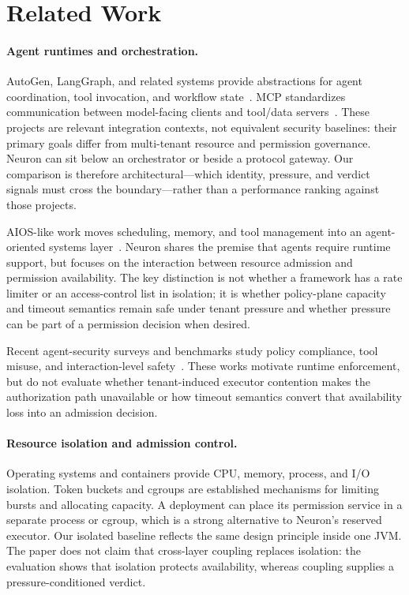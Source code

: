 \section{Related Work}
\label{sec:rw}
\label{sec:rw-sec}

\paragraph{Agent runtimes and orchestration.}
AutoGen, LangGraph, and related systems provide abstractions for agent
coordination, tool invocation, and workflow state~\cite{wu2023autogen,langgraph2024}.
MCP standardizes communication between model-facing clients and tool/data
servers~\cite{anthropic2024mcp}. These projects are relevant integration
contexts, not equivalent security baselines: their primary goals differ
from multi-tenant resource and permission governance. Neuron can sit below
an orchestrator or beside a protocol gateway. Our comparison is therefore
architectural---which identity, pressure, and verdict signals must cross the
boundary---rather than a performance ranking against those projects.

AIOS-like work moves scheduling, memory, and tool management into an
agent-oriented systems layer~\cite{mei2025aios}. Neuron shares the premise
that agents require runtime support, but focuses on the interaction between
resource admission and permission availability. The key distinction is not
whether a framework has a rate limiter or an access-control list in
isolation; it is whether policy-plane capacity and timeout semantics remain
safe under tenant pressure and whether pressure can be part of a permission
decision when desired.

Recent agent-security surveys and benchmarks study policy compliance, tool
misuse, and interaction-level safety~\cite{wang2024policy,ruan2024toolemu,zhang2024agentsafetybench,struppek2024agent}. These works motivate runtime
enforcement, but do not evaluate whether tenant-induced executor contention
makes the authorization path unavailable or how timeout semantics convert
that availability loss into an admission decision.

\paragraph{Resource isolation and admission control.}
Operating systems and containers provide CPU, memory, process, and I/O
isolation. Token buckets and cgroups are established mechanisms for limiting
bursts and allocating capacity. A deployment can place its permission
service in a separate process or cgroup, which is a strong alternative to
Neuron's reserved executor. Our isolated baseline reflects the same design
principle inside one JVM. The paper does not claim that cross-layer coupling
replaces isolation: the evaluation shows that isolation protects
availability, whereas coupling supplies a pressure-conditioned verdict.

